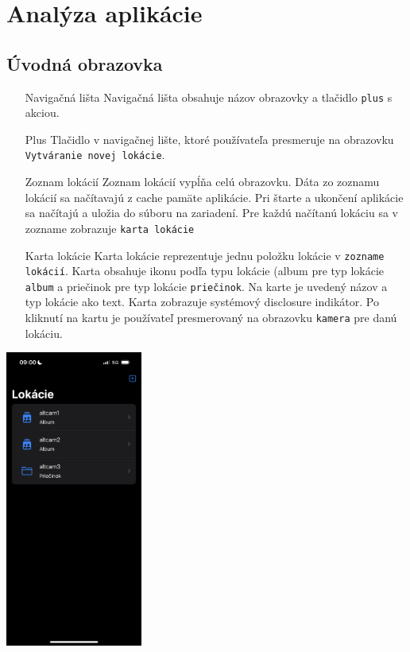 \documentclass[11pt]{article} %
\begin{document}
\pagebreak
\section{Analýza aplikácie}
\subsection{Úvodná obrazovka}
\begin{itemize}
\item[Navigačná lišta] {
	Navigačná lišta obsahuje názov obrazovky a tlačidlo {\tt plus} s akciou.
}
\item[Plus] {
	Tlačidlo v navigačnej lište, ktoré používateľa presmeruje na obrazovku {\tt Vytváranie novej lokácie}.
}
\item[Zoznam lokácií] {
	Zoznam lokácií vypĺňa celú obrazovku. Dáta zo zoznamu lokácií sa načítavajú z cache pamäte aplikácie. Pri štarte a ukončení aplikácie sa načítajú a uložia do súboru na zariadení. Pre každú načítanú lokáciu sa v zozname zobrazuje {\tt karta lokácie}
}
\item[Karta lokácie] {
	Karta lokácie reprezentuje jednu položku lokácie v {\tt zozname lokácií}. Karta obsahuje ikonu podľa typu lokácie (album pre typ lokácie {\tt album} a priečinok pre typ lokácie {\tt priečinok}. Na karte je uvedený názov a typ lokácie ako text. Karta zobrazuje systémový disclosure indikátor. Po kliknutí na kartu je používateľ presmerovaný na obrazovku {\tt kamera} pre danú lokáciu.
}
\end{itemize}
\begin{center}
\includegraphics[width=4.5cm]{uvod.jpeg}
\end{center}
\end{document}
